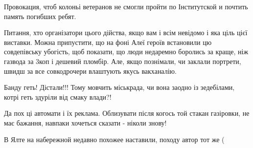 \begin{itemize}
 
Провокация, чтоб колоньі ветеранов не смогли пройти по Інститутской и почтить память погибших ребят.


 

Питання, хто організатори цього дійства, якщо вам і всім невідомо і яка ціль
цієї виставки. Можна припустити, що на фоні Алеї героїв встановили цю
совдепівську убогість, щоб показати, що люди недаремно боролись за краще, ніж
газвода за 3коп і дешевий пломбір. Але, якщо познімали, чи заклали портрети,
швидш за все совкодрочери влаштують якусь вакханалію.


 
Банду геть! Дістали!!! Тому мовчить міськрада, чи вона заодно із зедебілами, котрі геть здуріли від смаку влади?!

 

Да пох ці автомати і їх реклама. Облизувати після когось той стакан газіровки,
не має бажання, навпаки хочеться сказати - ніколи знову!

 

В Ялте на набережной недавно похожее наставили, походу автор тот же (


 


\end{itemize}
